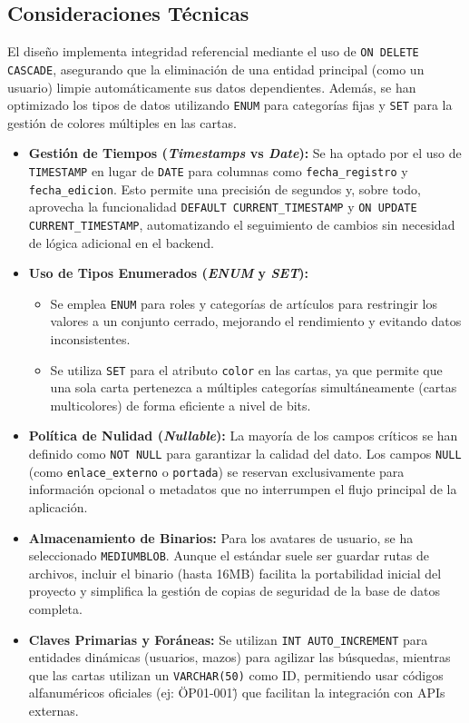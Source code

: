 \documentclass[10pt]{article}
\begin{document}
			\subsection{Consideraciones Técnicas}
			El diseño implementa integridad referencial mediante el uso de \texttt{ON DELETE CASCADE}, asegurando que la eliminación de una entidad principal (como un usuario) limpie automáticamente sus datos dependientes. Además, se han optimizado los tipos de datos utilizando \texttt{ENUM} para categorías fijas y \texttt{SET} para la gestión de colores múltiples en las cartas.
			\begin{itemize}
				\item \textbf{Gestión de Tiempos (\textit{Timestamps} vs \textit{Date}):} Se ha optado por el uso de \texttt{TIMESTAMP} en lugar de \texttt{DATE} para columnas como \texttt{fecha\_registro} y \texttt{fecha\_edicion}. Esto permite una precisión de segundos y, sobre todo, aprovecha la funcionalidad \texttt{DEFAULT CURRENT\_TIMESTAMP} y \texttt{ON UPDATE CURRENT\_TIMESTAMP}, automatizando el seguimiento de cambios sin necesidad de lógica adicional en el backend.
				
				\item \textbf{Uso de Tipos Enumerados (\textit{ENUM} y \textit{SET}):} 
				\begin{itemize}
					\item Se emplea \texttt{ENUM} para roles y categorías de artículos para restringir los valores a un conjunto cerrado, mejorando el rendimiento y evitando datos inconsistentes.
					\item Se utiliza \texttt{SET} para el atributo \texttt{color} en las cartas, ya que permite que una sola carta pertenezca a múltiples categorías simultáneamente (cartas multicolores) de forma eficiente a nivel de bits.
				\end{itemize}
				
				\item \textbf{Política de Nulidad (\textit{Nullable}):} La mayoría de los campos críticos se han definido como \texttt{NOT NULL} para garantizar la calidad del dato. Los campos \texttt{NULL} (como \texttt{enlace\_externo} o \texttt{portada}) se reservan exclusivamente para información opcional o metadatos que no interrumpen el flujo principal de la aplicación.
				
				\item \textbf{Almacenamiento de Binarios:} Para los avatares de usuario, se ha seleccionado \texttt{MEDIUMBLOB}. Aunque el estándar suele ser guardar rutas de archivos, incluir el binario (hasta 16MB) facilita la portabilidad inicial del proyecto y simplifica la gestión de copias de seguridad de la base de datos completa.
				
				\item \textbf{Claves Primarias y Foráneas:} Se utilizan \texttt{INT AUTO\_INCREMENT} para entidades dinámicas (usuarios, mazos) para agilizar las búsquedas, mientras que las cartas utilizan un \texttt{VARCHAR(50)} como ID, permitiendo usar códigos alfanuméricos oficiales (ej: \"OP01-001\") que facilitan la integración con APIs externas.
			\end{itemize}
	
\end{document}
